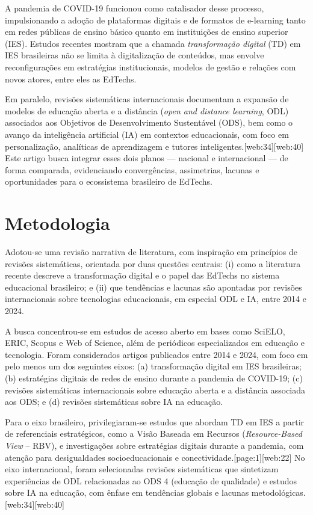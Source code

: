 \documentclass[12pt]{article}
\begin{document}
A pandemia de COVID-19 funcionou como catalisador desse processo, impulsionando a ado\c{c}\~ao de plataformas digitais e de formatos de e-learning tanto em redes p\'ublicas de ensino b\'asico quanto em institui\c{c}\~oes de ensino superior (IES). Estudos recentes mostram que a chamada \emph{transforma\c{c}\~ao digital} (TD) em IES brasileiras n\~ao se limita \`a digitaliza\c{c}\~ao de conte\'udos, mas envolve reconfigura\c{c}\~oes em estrat\'egias institucionais, modelos de gest\~ao e rela\c{c}\~oes com novos atores, entre eles as EdTechs.

Em paralelo, revis\~oes sistem\'aticas internacionais documentam a expans\~ao de modelos de educa\c{c}\~ao aberta e a dist\^ancia (\emph{open and distance learning}, ODL) associados aos Objetivos de Desenvolvimento Sustent\'avel (ODS), bem como o avan\c{c}o da intelig\^encia artificial (IA) em contextos educacionais, com foco em personaliza\c{c}\~ao, anal\'iticas de aprendizagem e tutores inteligentes.[web:34][web:40] Este artigo busca integrar esses dois planos --- nacional e internacional --- de forma comparada, evidenciando converg\^encias, assimetrias, lacunas e oportunidades para o ecossistema brasileiro de EdTechs.

\section{Metodologia}

Adotou-se uma revis\~ao narrativa de literatura, com inspira\c{c}\~ao em princ\'ipios de revis\~oes sistem\'aticas, orientada por duas quest\~oes centrais: (i) como a literatura recente descreve a transforma\c{c}\~ao digital e o papel das EdTechs no sistema educacional brasileiro; e (ii) que tend\^encias e lacunas s\~ao apontadas por revis\~oes internacionais sobre tecnologias educacionais, em especial ODL e IA, entre 2014 e 2024.

A busca concentrou-se em estudos de acesso aberto em bases como SciELO, ERIC, Scopus e Web of Science, al\'em de peri\'odicos especializados em educa\c{c}\~ao e tecnologia. Foram considerados artigos publicados entre 2014 e 2024, com foco em pelo menos um dos seguintes eixos: (a) transforma\c{c}\~ao digital em IES brasileiras; (b) estrat\'egias digitais de redes de ensino durante a pandemia de COVID-19; (c) revis\~oes sistem\'aticas internacionais sobre educa\c{c}\~ao aberta e a dist\^ancia associada aos ODS; e (d) revis\~oes sistem\'aticas sobre IA na educa\c{c}\~ao.

Para o eixo brasileiro, privilegiaram-se estudos que abordam TD em IES a partir de referenciais estrat\'egicos, como a Vis\~ao Baseada em Recursos (\emph{Resource-Based View} -- RBV), e investiga\c{c}\~oes sobre estrat\'egias digitais durante a pandemia, com aten\c{c}\~ao para desigualdades socioeducacionais e conectividade.[page:1][web:22] No eixo internacional, foram selecionadas revis\~oes sistem\'aticas que sintetizam experi\^encias de ODL relacionadas ao ODS 4 (educa\c{c}\~ao de qualidade) e estudos sobre IA na educa\c{c}\~ao, com \^enfase em tend\^encias globais e lacunas metodol\'ogicas.[web:34][web:40]
\end{document}
